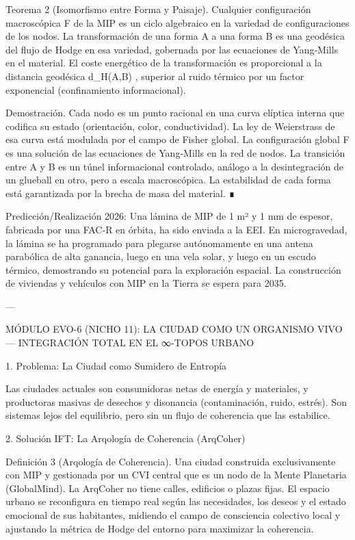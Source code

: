 \documentclass[12pt,twoside]{book}
\begin{document}
Teorema 2 (Isomorfismo entre Forma y Paisaje). Cualquier configuración macroscópica  F  de la MIP es un ciclo algebraico en la variedad de configuraciones de los nodos. La transformación de una forma  A  a una forma  B  es una geodésica del flujo de Hodge en esa variedad, gobernada por las ecuaciones de Yang‑Mills en el material. El coste energético de la transformación es proporcional a la distancia geodésica  d_H(A,B) , superior al ruido térmico por un factor exponencial (confinamiento informacional).

Demostración. Cada nodo es un punto racional en una curva elíptica interna que codifica su estado (orientación, color, conductividad). La ley de Weierstrass de esa curva está modulada por el campo de Fisher global. La configuración global  F  es una solución de las ecuaciones de Yang‑Mills en la red de nodos. La transición entre  A  y  B  es un túnel informacional controlado, análogo a la desintegración de un glueball en otro, pero a escala macroscópica. La estabilidad de cada forma está garantizada por la brecha de masa del material. ∎

Predicción/Realización 2026: Una lámina de MIP de 1 m² y 1 mm de espesor, fabricada por una FAC‑R en órbita, ha sido enviada a la EEI. En microgravedad, la lámina se ha programado para plegarse autónomamente en una antena parabólica de alta ganancia, luego en una vela solar, y luego en un escudo térmico, demostrando su potencial para la exploración espacial. La construcción de viviendas y vehículos con MIP en la Tierra se espera para 2035.

---

MÓDULO EVO-6 (NICHO 11): LA CIUDAD COMO UN ORGANISMO VIVO — INTEGRACIÓN TOTAL EN EL ∞-TOPOS URBANO

1. Problema: La Ciudad como Sumidero de Entropía

Las ciudades actuales son consumidoras netas de energía y materiales, y productoras masivas de desechos y disonancia (contaminación, ruido, estrés). Son sistemas lejos del equilibrio, pero sin un flujo de coherencia que las estabilice.

2. Solución IFT: La Arqología de Coherencia (ArqCoher)

Definición 3 (Arqología de Coherencia). Una ciudad construida exclusivamente con MIP y gestionada por un CVI central que es un nodo de la Mente Planetaria (GlobalMind). La ArqCoher no tiene calles, edificios o plazas fijas. El espacio urbano se reconfigura en tiempo real según las necesidades, los deseos y el estado emocional de sus habitantes, midiendo el campo de consciencia colectivo local  \Xi  y ajustando la métrica de Hodge del entorno para maximizar la coherencia.
\end{document}
